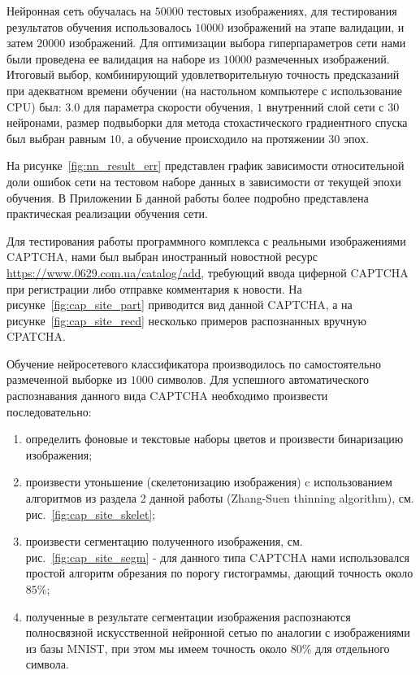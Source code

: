 \documentclass[a4paper,12pt,russian]{article} %
\begin{document}
Нейронная сеть обучалась на $50000$ тестовых изображениях, для тестирования результатов обучения использовалось $10000$ изображений на этапе валидации, и затем $20000$ изображений.
Для оптимизации выбора гиперпараметров сети нами были проведена ее валидация на наборе из $10000$ размеченных изображений.
Итоговый выбор, комбинирующий удовлетворительную точность предсказаний при адекватном времени обучении (на настольном компьютере с использование CPU) был: $3.0$ для параметра скорости обучения, $1$ внутренний слой сети с $30$ нейронами, размер подвыборки для метода стохастического градиентного спуска был выбран равным $10$, а обучение происходило на протяжении $30$ эпох.

На рисунке~\ref{fig:nn_result_err} представлен график зависимости относительной доли ошибок сети на тестовом наборе данных в зависимости от текущей эпохи обучения.
В Приложении Б данной работы более подробно представлена практическая реализации обучения сети.

Для тестирования работы программного комплекса с реальными изображениями CAPTCHA, нами был выбран иностранный новостной ресурс \url{https://www.0629.com.ua/catalog/add}, требующий ввода циферной CAPTCHA при регистрации либо отправке комментария к новости.
На рисунке~\ref{fig:cap_site_part} приводится вид данной CAPTCHA, а на рисунке~\ref{fig:cap_site_recd} несколько примеров распознанных вручную CPATCHA.

Обучение нейросетевого классификатора производилось по самостоятельно размеченной выборке из $1000$ символов.
Для успешного автоматического распознавания данного вида CAPTCHA необходимо произвести последовательно:
\begin{enumerate}
	\item определить фоновые и текстовые наборы цветов и произвести бинаризацию изображения;
	\item произвести утоньшение (скелетонизацию изображения) c использованием алгоритмов из раздела 2 данной работы (Zhang-Suen thinning algorithm), см. рис.~\ref{fig:cap_site_skelet};
	\item произвести сегментацию полученного изображения, см. рис.~\ref{fig:cap_site_segm} - для данного типа CAPTCHA нами использовался простой алгоритм обрезания по порогу гистограммы, дающий точность около $85\%$;
	\item полученные в результате сегментации изображения распознаются полносвязной искусственной нейронной сетью по аналогии с изображениями из базы MNIST, при этом мы имеем точность около $80\%$ для отдельного символа.
\end{enumerate}
\end{document}
